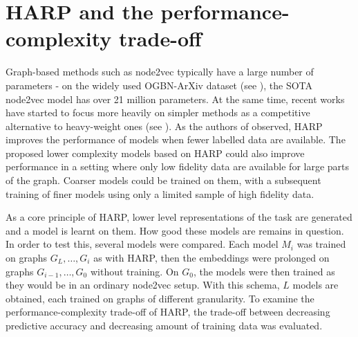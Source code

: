 \section{HARP and the performance-complexity trade-off}\label{sec:performance-vs-complexity}

Graph-based methods such as node2vec typically have a large number of parameters - on the widely used OGBN-ArXiv dataset (see \cite{hu_open_2021}), the SOTA node2vec model has over 21 million parameters. At the same time, recent works have started to focus more heavily on simpler methods as a competitive alternative to heavy-weight ones (see \cite{frasca_sign_2020,huang_combining_2020,salha_keep_2019,zhang_eigen-gnn_2020}). As the authors of \cite{chen_harp_2018} observed, HARP improves the performance of models when fewer labelled data are available. The proposed lower complexity models based on HARP could also improve performance in a setting where only low fidelity data are available for large parts of the graph. Coarser models could be trained on them, with a subsequent training of finer models using only a limited sample of high fidelity data.

As a core principle of HARP, lower level representations of the task are generated and a model is learnt on them. How good these models are remains in question. In order to test this, several models were compared. Each model \( M_i \) was trained on graphs \( G_L, \dots, G_i \) as with HARP, then the embeddings were prolonged on graphs \( G_{i-1}, \dots, G_0 \) without training. On \( G_0 \), the models were then trained as they would be in an ordinary node2vec setup. With this schema, \( L \) models are obtained, each trained on graphs of different granularity. To examine the performance-complexity trade-off of HARP, the trade-off between decreasing predictive accuracy and decreasing amount of training data was evaluated.
